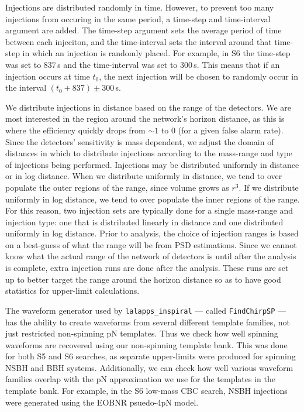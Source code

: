 Injections are distributed randomly in time. However, to prevent too many injections from occuring in the same period, a time-step and time-interval argument are added. The time-step argument sets the average period of time between each injeciton, and the time-interval sets the interval around that time-step in which an injection is randomly placed. For example, in \ac{S6} the time-step was set to $837\,$s and the time-interval was set to $300\,$s. This means that if an injection occurs at time $t_0$, the next injection will be chosen to randomly occur in the interval $(t_0 + 837) \pm 300\,$s.

We distribute injections in distance based on the range of the detectors. We are most interested in the region around the network's horizon distance, as this is where the efficiency quickly drops from $\sim1$ to $0$ (for a given false alarm rate). Since the detectors' sensitivity is mass dependent, we adjust the domain of distances in which to distribute injections according to the mass-range and type of injections being performed. Injections may be distributed uniformly in distance or in log distance. When we distribute uniformly in distance, we tend to over populate the outer regions of the range, since volume grows as $r^3$. If we distribute uniformly in log distance, we tend to over populate the inner regions of the range. For this reason, two injection sets are typically done for a single mass-range and injection type: one that is distributed linearly in distance and one distributed uniformly in log distance. Prior to analysis, the choice of injection ranges is based on a best-guess of what the range will be from \ac{PSD} estimations. Since we cannot know what the actual range of the network of detectors is until after the analysis is complete, extra injection runs are done after the analysis. These runs are set up to better target the range around the horizon distance so as to have good statistics for upper-limit calculations.

The waveform generator used by \texttt{lalapps\_inspiral} --- called \texttt{FindChirpSP} --- has the ability to create waveforms from several different template families, not just restricted non-spinning \ac{pN} templates. Thus we check how well spinning waveforms are recovered using our non-spinning template bank. This was done for both \ac{S5} and \ac{S6} searches, as separate upper-limits were produced for spinning \ac{NSBH} and \ac{BBH} systems. Additionally, we can check how well various waveform families overlap with the \ac{pN} approximation we use for the templates in the template bank. For example, in the \ac{S6} low-mass \ac{CBC} search, \ac{NSBH} injections were generated using the EOBNR psuedo-4\ac{pN} model.

